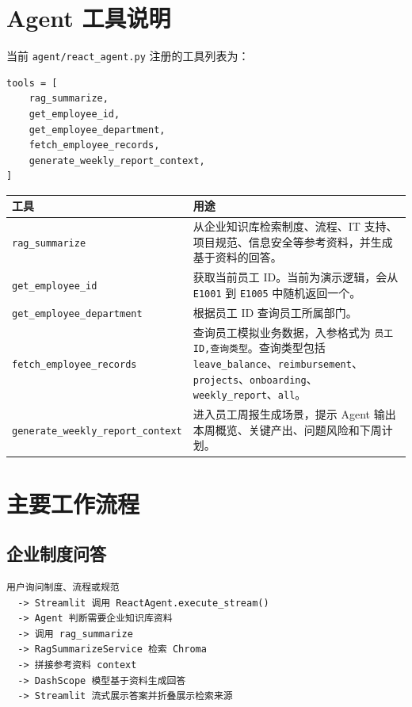 \documentclass[UTF8,zihao=-4]{ctexart}
\begin{document}
\section{Agent 工具说明}

当前 \texttt{agent/react\_agent.py} 注册的工具列表为：

\begin{Verbatim}[breaklines=true,breakanywhere=true,fontsize=\small]
tools = [
    rag_summarize,
    get_employee_id,
    get_employee_department,
    fetch_employee_records,
    generate_weekly_report_context,
]
\end{Verbatim}

\begin{longtable}{p{}p{}}
\textbf{工具} & \textbf{用途} \\
\hline
\texttt{rag\_summarize} & 从企业知识库检索制度、流程、IT 支持、项目规范、信息安全等参考资料，并生成基于资料的回答。 \\
\texttt{get\_employee\_id} & 获取当前员工 ID。当前为演示逻辑，会从 \texttt{E1001} 到 \texttt{E1005} 中随机返回一个。 \\
\texttt{get\_employee\_department} & 根据员工 ID 查询员工所属部门。 \\
\texttt{fetch\_employee\_records} & 查询员工模拟业务数据，入参格式为 \texttt{员工ID,查询类型}。查询类型包括 \texttt{leave\_balance}、\texttt{reimbursement}、\texttt{projects}、\texttt{onboarding}、\texttt{weekly\_report}、\texttt{all}。 \\
\texttt{generate\_weekly\_report\_context} & 进入员工周报生成场景，提示 Agent 输出本周概览、关键产出、问题风险和下周计划。 \\
\end{longtable}

\section{主要工作流程}

\subsection{企业制度问答}

\begin{Verbatim}[breaklines=true,breakanywhere=true,fontsize=\small]
用户询问制度、流程或规范
  -> Streamlit 调用 ReactAgent.execute_stream()
  -> Agent 判断需要企业知识库资料
  -> 调用 rag_summarize
  -> RagSummarizeService 检索 Chroma
  -> 拼接参考资料 context
  -> DashScope 模型基于资料生成回答
  -> Streamlit 流式展示答案并折叠展示检索来源
\end{Verbatim}
\end{document}
